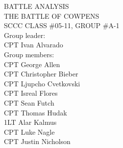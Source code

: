






\thispagestyle{empty}

\begin{titlepage}
	\begin{center}
	  \begin{singlespace}
		BATTLE ANALYSIS\\
		\vspace{3em}
		THE BATTLE OF COWPENS\\
		\vspace{3em}
		SCCC CLASS \#05-11, GROUP \#A-1\\
		\vspace{3em}
		Group leader:\\
		\vspace{1em}
		CPT Ivan Alvarado\\
		\vspace{2em}
		Group members:\\
		\vspace{1em}
		CPT George Allen\\
		CPT Christopher Bieber\\
		CPT Ljupcho Cvetkovski\\
		CPT Isreal Flores\\
		CPT Sean Futch\\
		CPT Thomas Hudak\\
		1LT Alar Kalmus\\
		CPT Luke Nagle\\
		CPT Justin Nicholson\\
	  \end{singlespace}
	\end{center}
\end{titlepage}

\pagestyle{scrheadings}
\ohead{\headmark}
%
\chead{}
\setheadsepline{.1pt}

\begin{singlespace}
  \setcounter{tocdepth}{2}
\tableofcontents
  \newpage
\listoffigures
\listoftables
\end{singlespace}

\newpage
{}

\newpage

\newpage


\newpage

\newpage

\newpage

\newpage

% 
% 



